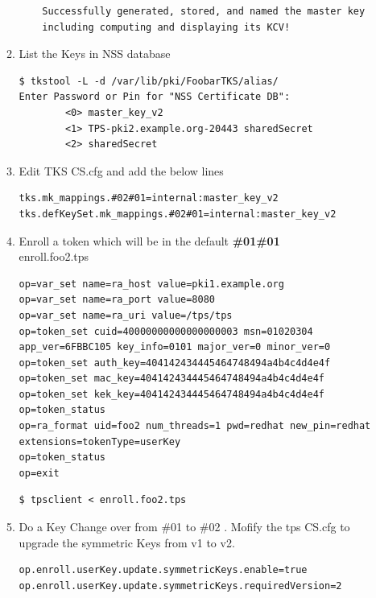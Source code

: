 \documentclass[a4paper]{article}
\begin{document}
\begin{enumerate}[label*=\arabic*.]
\begin{enumerate}[label*=\arabic*.]
\begin{lstlisting}
    Successfully generated, stored, and named the master key
    including computing and displaying its KCV!
                    \end{lstlisting}
                \item List the Keys in NSS database
                    \begin{lstlisting}[style=bashInputStyle]
$ tkstool -L -d /var/lib/pki/FoobarTKS/alias/                    
Enter Password or Pin for "NSS Certificate DB":
        <0> master_key_v2
        <1> TPS-pki2.example.org-20443 sharedSecret
        <2> sharedSecret
                    \end{lstlisting}
                \item Edit TKS CS.cfg and add the below lines
                    \begin{lstlisting}
tks.mk_mappings.#02#01=internal:master_key_v2
tks.defKeySet.mk_mappings.#02#01=internal:master_key_v2
                    \end{lstlisting}
                \item Enroll a token which will be in the default \textbf{\#01\#01} \\
                    enroll.foo2.tps
                    \begin{lstlisting}[style=configFile]
op=var_set name=ra_host value=pki1.example.org
op=var_set name=ra_port value=8080
op=var_set name=ra_uri value=/tps/tps
op=token_set cuid=40000000000000000003 msn=01020304 app_ver=6FBBC105 key_info=0101 major_ver=0 minor_ver=0
op=token_set auth_key=404142434445464748494a4b4c4d4e4f
op=token_set mac_key=404142434445464748494a4b4c4d4e4f
op=token_set kek_key=404142434445464748494a4b4c4d4e4f
op=token_status
op=ra_format uid=foo2 num_threads=1 pwd=redhat new_pin=redhat extensions=tokenType=userKey
op=token_status
op=exit
                    \end{lstlisting}
                    \begin{lstlisting}[style=bashInputStyle]
$ tpsclient < enroll.foo2.tps
                    \end{lstlisting}
                \item Do a Key Change over from \#01 to \#02 . Mofify the tps CS.cfg to upgrade the symmetric Keys from v1 to v2.
                    \begin{lstlisting}
op.enroll.userKey.update.symmetricKeys.enable=true
op.enroll.userKey.update.symmetricKeys.requiredVersion=2
                    \end{lstlisting}
                    \begin{lstlisting}[style=bashInputStyle]

\end{lstlisting}
\end{enumerate}
\end{enumerate}
\end{document}
